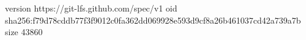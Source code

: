 version https://git-lfs.github.com/spec/v1
oid sha256:f79d78cddb77f3f9012c0fa362dd069928e593d9cf8a26b461037cd42a739a7b
size 43860
